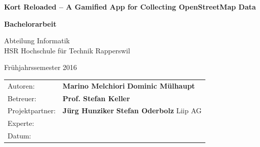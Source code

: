 \begin{titlepage}

\begin{figure}[H]
\hfill
{}
\end{figure}

\vspace{2cm}

\begin{center}
{ \Large
	\textbf{Kort Reloaded – A Gamified App for Collecting OpenStreetMap Data}
	\vspace{1cm}

	\textbf{Bachelorarbeit}
	\vspace{1cm}

	Abteilung Informatik \\[0.2cm]
	HSR Hochschule für Technik Rapperswil
	\vspace{1cm}

	Frühjahrssemester 2016
}
\end{center}
\vspace{1cm}


\begin{table}[H] 
\centering 
\begin{tabular}{p{0.19\twocelltabwidth}p{0.4\twocelltabwidth}}
Autoren: & \textbf{Marino Melchiori} \newline
\textbf{Dominic Mülhaupt} \\ 
Betreuer: & \textbf{Prof. Stefan Keller} \\ 
Projektpartner: & \textbf{Jürg Hunziker} \newline
\textbf{Stefan Oderbolz} \newline
Liip AG\\ 
Experte: & \textbf{} \\ 
Datum: & \textbf{} \\ 
\end{tabular}
\end{table}

\end{titlepage}